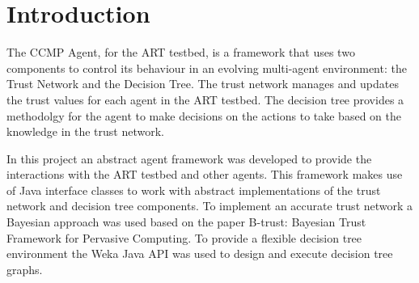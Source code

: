 \section{Introduction}
The CCMP Agent, for the ART testbed, is a framework that uses two components to
control its behaviour in an evolving multi-agent environment: the Trust Network
and the Decision Tree.  The trust network manages and updates the trust values
for each agent in the ART testbed. The decision tree provides a methodolgy for
the agent to make decisions on the actions to take based on the knowledge in the
trust network. 

In this project an abstract agent framework was developed to provide the
interactions with the ART testbed and other agents.  This framework makes use
of Java interface classes to work with abstract implementations of the trust
network and decision tree components.  To implement an accurate trust network a
Bayesian approach was used based on the paper B-trust: Bayesian Trust Framework
for Pervasive Computing.  To provide a flexible decision tree environment the Weka Java API
was used to design and execute decision tree graphs.